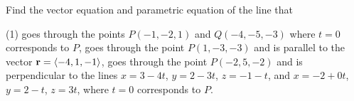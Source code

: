 \documentclass[mathNotesPreamble]{subfiles}
\begin{document}
  \noindent
  \pagebreak
  \begin{ex*}
    Find the vector equation and parametric equation of the line that 
    \begin{tasks}[after-item-skip=\stretch{1}, label=\textbullet](1)
      \task goes through the points $P(-1,-2,1)$ and $Q(-4,-5,-3)$ where $t=0$ corresponds to $P$,
      \task goes through the point $P(1,-3,-3)$ and is parallel to the vector ${\mathbf{r}}={\left\langle -4,1,-1 \right\rangle}$,
      \task goes through the point $P(-2,5,-2)$ and is perpendicular to the lines $x=3-4t$, $y=2-3t$, $z=-1-t$, and $x=-2+0t$, $y=2-t$, $z=3t$, where $t=0$ corresponds to $P$.
    \end{tasks}
  \end{ex*}
\end{document}

